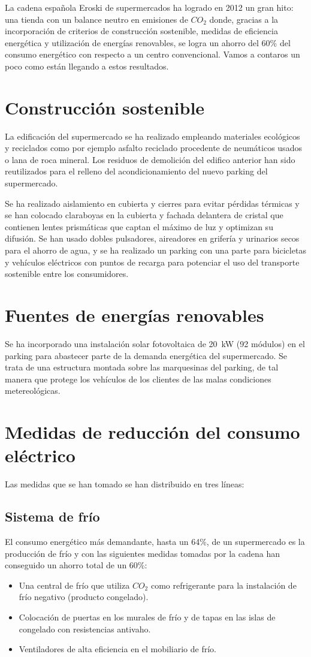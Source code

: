 \begin{multicols}{2}
\cappar La cadena española Eroski de supermercados ha logrado en 2012 un gran hito: una tienda con un balance neutro en emisiones de $CO_2$ donde, gracias a la
incorporación de criterios de construcción sostenible, medidas de eficiencia energética y utilización de energías renovables, se
logra un ahorro del 60\% del consumo energético con respecto a un centro convencional. Vamos a contaros un poco como están llegando a estos resultados.
\section{Construcción sostenible}
La edificación del supermercado se ha realizado empleando materiales ecológicos y reciclados como por ejemplo asfalto reciclado procedente de neumáticos usados o lana de roca mineral. Los residuos de demolición del edifico anterior han sido reutilizados para el relleno del acondicionamiento del nuevo parking del supermercado. 

Se ha realizado aislamiento en cubierta y cierres para evitar pérdidas térmicas y se han colocado claraboyas en la cubierta y fachada delantera de cristal que contienen lentes prismáticas que captan el máximo de luz y optimizan su difusión. Se han usado dobles pulsadores, aireadores en grifería  y urinarios secos para el ahorro de agua, y se ha realizado un parking con una parte para bicicletas y vehículos eléctricos con puntos de recarga para potenciar el uso del transporte sostenible entre los consumidores.

\section{Fuentes de energías renovables}

Se ha incorporado una instalación solar fotovoltaica de \SI{20}{kW} (92 módulos) en el parking para abastecer parte de la demanda energética del supermercado. Se trata de una estructura montada sobre las marquesinas del parking, de tal manera que protege los vehículos de los clientes de las malas condiciones metereológicas.
\section{Medidas de reducción del consumo eléctrico}
Las medidas que se han tomado se han distribuido en tres líneas:
\subsection{Sistema de frío}
El consumo energético más demandante, hasta un 64\%,  de un supermercado es la producción de frío y con las siguientes medidas tomadas por la cadena han conseguido un ahorro total de un 60\%:
\begin{itemize}
\item Una central de frío que utiliza $CO_2$ como refrigerante para la instalación de frío negativo (producto congelado).
\item Colocación de puertas en los murales de frío y de tapas en las islas de congelado con resistencias antivaho.
\item Ventiladores de alta eficiencia en el mobiliario de frío.
\end{itemize}

\end{multicols}
